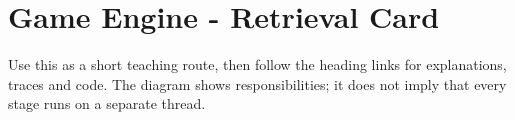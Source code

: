 \hypertarget{appendix-64ea716dcadc}{}\label{referencestart:appendix-64ea716dcadc}
\section{Game Engine - Retrieval Card}\label{appendix-64ea716dcadc-game-engine---retrieval-card}

\hypertarget{appendix-64ea716dcadc-game-engine---retrieval-card}{}

Use this as a short teaching route, then follow the heading links for explanations, traces and code. The diagram shows responsibilities; it does not imply that every stage runs on a separate thread.


